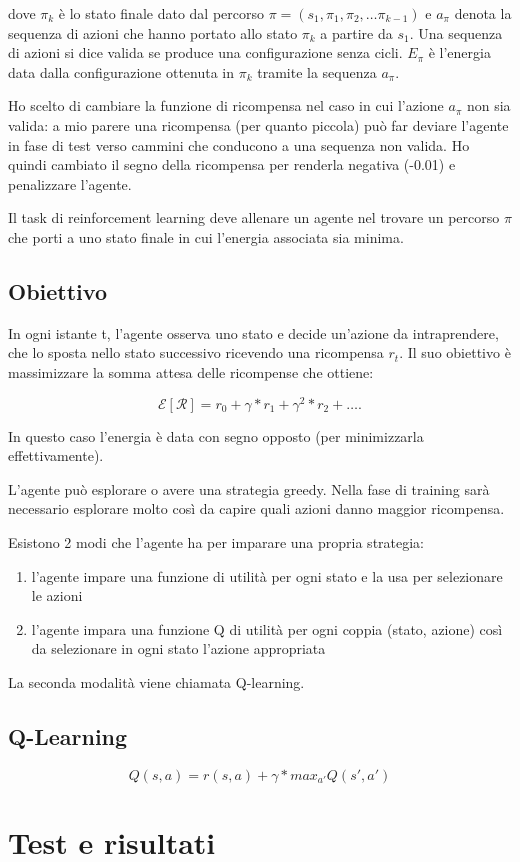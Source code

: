 \documentclass[twocolumn,10pt]{asme2ej}
\begin{document}
dove $\pi_k$ è lo stato finale dato dal percorso $\pi = (s_1, \pi_1, \pi_2, \dots \pi_{k-1})$ e $a_{\pi}$ denota la sequenza di azioni che hanno portato allo stato $\pi_k$ a partire da $s_1$. Una sequenza di azioni si dice valida se produce una configurazione senza cicli. $E_{\pi}$ è l'energia data dalla configurazione ottenuta in $\pi_k$ tramite la sequenza $a_{\pi}$.

Ho scelto di cambiare la funzione di ricompensa nel caso in cui l'azione $a_{\pi}$ non sia valida: a mio parere una ricompensa (per quanto piccola) può far deviare l'agente in fase di test verso cammini che conducono a una sequenza non valida. Ho quindi cambiato il segno della ricompensa per renderla negativa (-0.01) e penalizzare l'agente.

Il task di reinforcement learning deve allenare un agente nel trovare un percorso $\pi$ che porti a uno stato finale in cui l'energia associata sia minima.

\subsection{Obiettivo}

In ogni istante t, l'agente osserva uno stato e decide un'azione da intraprendere, che lo sposta nello stato successivo ricevendo una ricompensa $r_t$. Il suo obiettivo è massimizzare la somma attesa delle ricompense che ottiene:

\begin{equation}
\mathcal{E}[\mathcal{R}] = r_0 + \gamma*r_1 + \gamma^2*r_2 + \dots.
\end{equation}

In questo caso l'energia è data con segno opposto (per minimizzarla effettivamente).

L'agente può esplorare o avere una strategia greedy. Nella fase di training sarà necessario esplorare molto così da capire quali azioni danno maggior ricompensa.

Esistono 2 modi che l'agente ha per imparare una propria strategia:

\begin{enumerate}
 \item l'agente impare una funzione di utilità per ogni stato e la usa per selezionare le azioni
 \item l'agente impara una funzione Q di utilità per ogni coppia (stato, azione) così da selezionare in ogni stato l'azione appropriata
\end{enumerate}

La seconda modalità viene chiamata Q-learning.

\subsection{Q-Learning}

\begin{equation}
Q(s,a) = r(s,a) + \gamma * max_{a'} Q(s', a')
\end{equation}



\section{Test e risultati}



%

%
\end{document}
